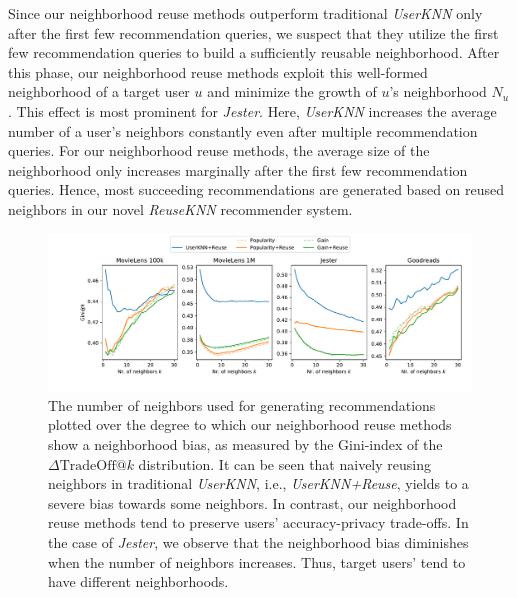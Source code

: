 \documentclass[manuscript,review,anonymous]{acmart}
\begin{document}
Since our neighborhood reuse methods outperform traditional \emph{UserKNN} only after the first few recommendation queries, we suspect that they utilize the first few recommendation queries to build a sufficiently reusable neighborhood.
After this phase, our neighborhood reuse methods exploit this well-formed neighborhood of a target user $u$ and minimize the growth of $u$'s neighborhood $N_u$.
This effect is most prominent for \emph{Jester}.
Here, \emph{UserKNN} increases the average number of a user's neighbors constantly even after multiple recommendation queries.
For our neighborhood reuse methods, the average size of the neighborhood only increases marginally after the first few recommendation queries. 
Hence, most succeeding recommendations are generated based on reused neighbors in our novel \emph{ReuseKNN} recommender system.

\begin{figure}[!t]
    \centering
    \includegraphics[width=\linewidth]{figures/gini.pdf}
    \caption{The number of neighbors used for generating recommendations plotted over the degree to which our neighborhood reuse methods show a neighborhood bias, as measured by the Gini-index of the $\Delta \text{TradeOff}@k$ distribution. 
    It can be seen that naively reusing neighbors in traditional \emph{UserKNN}, i.e., \emph{UserKNN+Reuse}, yields to a severe bias towards some neighbors.
    In contrast, our neighborhood reuse methods tend to preserve users' accuracy-privacy trade-offs. In the case of \emph{Jester}, we observe that the neighborhood bias diminishes when the number of neighbors increases. Thus, target users' tend to have different neighborhoods.
    }
    \label{fig:results_gini}
\end{figure}
\end{document}
